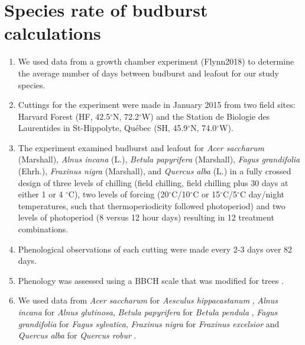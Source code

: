 \documentclass{article}\usepackage[]{graphicx}\usepackage[]{color}
\begin{document}
\section*{Species rate of budburst calculations}
\begin{enumerate}
\item We used data from a growth chamber experiment (Flynn2018) to determine the average number of days between budburst and leafout for our study species. 
\item Cuttings for the experiment were made in January 2015 from two field sites: Harvard Forest (HF, 42.5$^{\circ}$N, 72.2$^{\circ}$W) and the Station de Biologie des Laurentides in St-Hippolyte, Qu\'ebec (SH, 45.9$^{\circ}$N, 74.0$^{\circ}$W). 
\item The experiment examined budburst and leafout for \textit{Acer saccharum} (Marshall), \textit{Alnus incana} (L.), \textit{Betula papyrifera} (Marshall), \textit{Fagus grandifolia} (Ehrh.), \textit{Fraxinus nigra} (Marshall), and \textit{Quercus alba} (L.) in a fully crossed design of three levels of chilling (field chilling, field chilling plus 30 days at either 1 or 4 $^{\circ}$C), two levels of forcing (20$^{\circ}$C/10$^{\circ}$C or 15$^{\circ}$C/5$^{\circ}$C day/night temperatures, such that thermoperiodicity followed photoperiod) and two levels of photoperiod (8 versus 12 hour days) resulting in 12 treatment combinations. 
\item Phenological observations of each cutting were made every 2-3 days over 82 days. 
\item Phenology was assessed using a BBCH scale that was modified for trees \citep{Finn2007}. 
\item We used data from \textit{Acer saccharum} for \textit{Aesculus hippacastanum} \citep{Buerki2010}, \textit{Alnus incana} for \textit{Alnus glutinosa}, \textit{Betula papyrifera} for \textit{Betula pendula} \citep{Wang2016}, \textit{Fagus grandifolia} for \textit{Fagus sylvatica}, \textit{Fraxinus nigra} for \textit{Fraxinus excelsior} and \textit{Quercus alba} for \textit{Quercus robur} \citep{Hipp2017}.
\end{enumerate}


\end{document}
